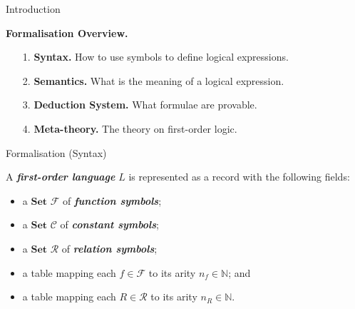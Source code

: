 \documentclass[serif,table,10pt]{beamer}
\newcommand{\IN}{\mathbb{N}}
\newcommand{\0}{\texttt{0}}
\newcommand{\1}{\texttt{1}}
\newcommand{\inlinedef}[1]{\emph{\textbf{#1}}}
\newcommand{\Set}{\mathbf{Set}}
\begin{document}
\begin{frame}{Introduction}

    \textbf{\large Formalisation Overview.}

    \begin{itemize} \large
        \item[{1.}] \textbf{Syntax.} How to use symbols to define logical expressions.
        \item[{2.}] \textbf{Semantics.} What is the meaning of a logical expression.
        \item[{3.}] \textbf{Deduction System.} What formulae are provable.
        \item[{4.}] \textbf{Meta-theory.} The theory on first-order logic.
    \end{itemize}

\end{frame}

\begin{frame}{Formalisation (Syntax)}
    
    A \inlinedef{first-order language} $L$ is represented as a record with the following fields:
    \begin{itemize}
        \item a $\Set$ $\mathcal{F}$ of \inlinedef{function symbols};
        \item a $\Set$ $\mathcal{C}$ of \inlinedef{constant symbols};
        \item a $\Set$ $\mathcal{R}$ of \inlinedef{relation symbols};
        \item a table mapping each $f \in \mathcal{F}$ to its arity $n_f \in \IN$; and
        \item a table mapping each $R \in \mathcal{R}$ to its arity $n_R \in \IN$.
    \end{itemize}

\end{frame}
\end{document}
